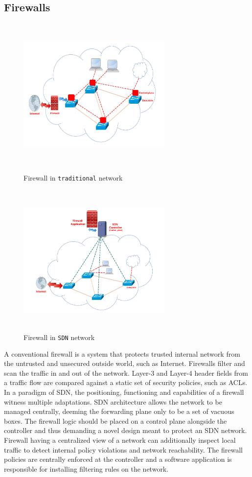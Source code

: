 \subsection{Firewalls}
\begin{figure}
	\includegraphics[height=3in, width=3in]{Pictures/traditionalFW.pdf}
	\caption{ Firewall in  \texttt{traditional} network}
	\includegraphics[height=3in, width=3in]{Pictures/SDNFW.pdf}
	\caption{ Firewall in  \texttt{SDN} network}
\end{figure}  
A conventional firewall is a system that protects trusted internal network from the untrusted and unsecured outside world, such as Internet.
Firewalls filter and scan the traffic in and out of the network. Layer-3 and Layer-4 header fields from a traffic flow are compared against a static set of security policies, such as ACLs. In a paradigm of SDN, the positioning, functioning and capabilities of a firewall witness multiple adaptations. SDN architecture allows the network to be managed centrally, deeming the forwarding plane only to be a set of vacuous boxes. The firewall logic should be placed on a control plane alongside the controller and thus demanding a novel design meant to protect an SDN network. Firewall having a centralized view of a network can additionally inspect local traffic to detect internal policy violations and network reachability. The firewall policies are centrally enforced at the controller and a software application is responsible for installing filtering rules on the network.
